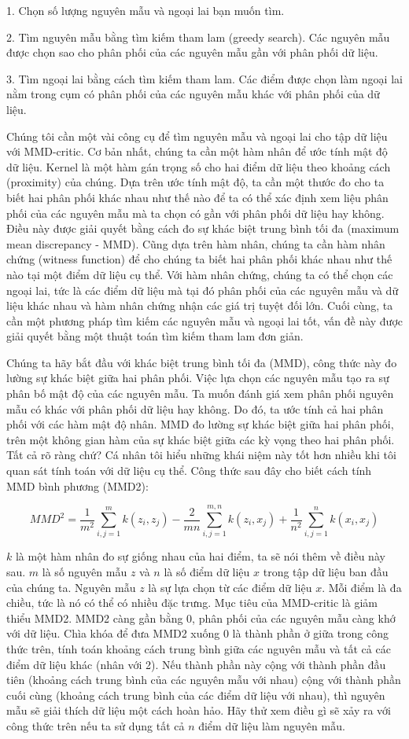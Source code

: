1. Chọn số lượng nguyên mẫu và ngoại lai bạn muốn tìm.

2. Tìm nguyên mẫu bằng tìm kiếm tham lam (greedy search). Các nguyên mẫu được chọn sao cho phân phối của các nguyên mẫu gần với phân phối dữ liệu.

3. Tìm ngoại lai bằng cách tìm kiếm tham lam. Các điểm được chọn làm ngoại lai nằm trong cụm có phân phối của các nguyên mẫu khác với phân phối của dữ liệu.

Chúng tôi cần một vài công cụ để tìm nguyên mẫu và ngoại lai cho tập dữ liệu với MMD-critic. Cơ bản nhất, chúng ta cần một hàm nhân để ước tính mật độ dữ liệu. Kernel là một hàm gán trọng số cho hai điểm dữ liệu theo khoảng cách (proximity) của chúng. Dựa trên ước tính mật độ, ta cần một thước đo cho ta biết hai phân phối khác nhau như thế nào để ta có thể xác định xem liệu phân phối của các nguyên mẫu mà ta chọn có gần với phân phối dữ liệu hay không. Điều này được giải quyết bằng cách đo sự khác biệt trung bình tối đa (maximum mean discrepancy - MMD). Cũng dựa trên hàm nhân, chúng ta cần hàm nhân chứng (witness function) để cho chúng ta biết hai phân phối khác nhau như thế nào tại một điểm dữ liệu cụ thể. Với hàm nhân chứng, chúng ta có thể chọn các ngoại lai, tức là các điểm dữ liệu mà tại đó phân phối của các nguyên mẫu và dữ liệu khác nhau và hàm nhân chứng nhận các giá trị tuyệt đối lớn. Cuối cùng, ta cần một phương pháp tìm kiếm các nguyên mẫu và ngoại lai tốt, vấn đề này được giải quyết bằng một thuật toán tìm kiếm tham lam đơn giản.

Chúng ta hãy bắt đầu với khác biệt trung bình tối đa (MMD), công thức này đo lường sự khác biệt giữa hai phân phối. Việc lựa chọn các nguyên mẫu tạo ra sự phân bố mật độ của các nguyên mẫu. Ta muốn đánh giá xem phân phối nguyên mẫu có khác với phân phối dữ liệu hay không. Do đó, ta ước tính cả hai phân phối với các hàm mật độ nhân. MMD đo lường sự khác biệt giữa hai phân phối, trên một không gian hàm của sự khác biệt giữa các kỳ vọng theo hai phân phối. Tất cả rõ ràng chứ? Cá nhân tôi hiểu những khái niệm này tốt hơn nhiều khi tôi quan sát tính toán với dữ liệu cụ thể. Công thức sau đây cho biết cách tính MMD bình phương (MMD2):

$$MMD^2=\frac{1}{m^2}\sum_{i,j=1}^m{}k(z_i,z_j)-\frac{2}{mn}\sum_{i,j=1}^{m,n}k(z_i,x_j)+\frac{1}{n^2}\sum_{i,j=1}^n{}k(x_i,x_j)$$

$k$ là một hàm nhân đo sự giống nhau của hai điểm, ta sẽ nói thêm về điều này sau. $m$ là số nguyên mẫu $z$ và $n$ là số điểm dữ liệu $x$ trong tập dữ liệu ban đầu của chúng ta. Nguyên mẫu $z$ là sự lựa chọn từ các điểm dữ liệu $x$. Mỗi điểm là đa chiều, tức là nó có thể có nhiều đặc trưng. Mục tiêu của MMD-critic là giảm thiểu MMD2. MMD2 càng gần bằng 0, phân phối của các nguyên mẫu càng khớ với dữ liệu. Chìa khóa để đưa MMD2 xuống 0 là thành phần ở giữa trong công thức trên, tính toán khoảng cách trung bình giữa các nguyên mẫu và tất cả các điểm dữ liệu khác (nhân với 2). Nếu thành phần này cộng với thành phần đầu tiên (khoảng cách trung bình của các nguyên mẫu với nhau) cộng với thành phần cuối cùng (khoảng cách trung bình của các điểm dữ liệu với nhau), thì nguyên mẫu sẽ giải thích dữ liệu một cách hoàn hảo. Hãy thử xem điều gì sẽ xảy ra với công thức trên nếu ta sử dụng tất cả $n$ điểm dữ liệu làm nguyên mẫu.

